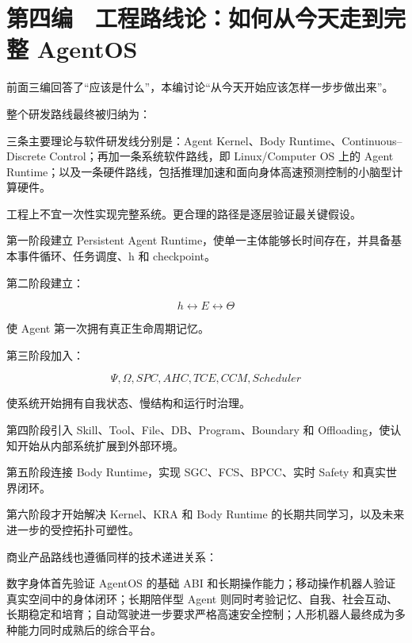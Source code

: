 \part{第四编　工程路线论：如何从今天走到完整 AgentOS}
前面三编回答了“应该是什么”，本编讨论“从今天开始应该怎样一步步做出来”。

整个研发路线最终被归纳为：

\begin{statementbox}
\centering
{}
\end{statementbox}

三条主要理论与软件研发线分别是：Agent Kernel、Body Runtime、Continuous–Discrete Control；再加一条系统软件路线，即 Linux/Computer OS 上的 Agent Runtime；以及一条硬件路线，包括推理加速和面向身体高速预测控制的小脑型计算硬件。

工程上不宜一次性实现完整系统。更合理的路径是逐层验证最关键假设。

第一阶段建立 Persistent Agent Runtime，使单一主体能够长时间存在，并具备基本事件循环、任务调度、h 和 checkpoint。

第二阶段建立：

$$
h\leftrightarrow E\leftrightarrow\Theta
$$

使 Agent 第一次拥有真正生命周期记忆。

第三阶段加入：

$$
\Psi,\Omega,SPC,AHC,TCE,CCM,Scheduler
$$

使系统开始拥有自我状态、慢结构和运行时治理。

第四阶段引入 Skill、Tool、File、DB、Program、Boundary 和 Offloading，使认知开始从内部系统扩展到外部环境。

第五阶段连接 Body Runtime，实现 SGC、FCS、BPCC、实时 Safety 和真实世界闭环。

第六阶段才开始解决 Kernel、KRA 和 Body Runtime 的长期共同学习，以及未来进一步的受控拓扑可塑性。

商业产品路线也遵循同样的技术递进关系：

\begin{statementbox}
\centering
{}
\end{statementbox}

数字身体首先验证 AgentOS 的基础 ABI 和长期操作能力；移动操作机器人验证真实空间中的身体闭环；长期陪伴型 Agent 则同时考验记忆、自我、社会互动、长期稳定和培育；自动驾驶进一步要求严格高速安全控制；人形机器人最终成为多种能力同时成熟后的综合平台。

